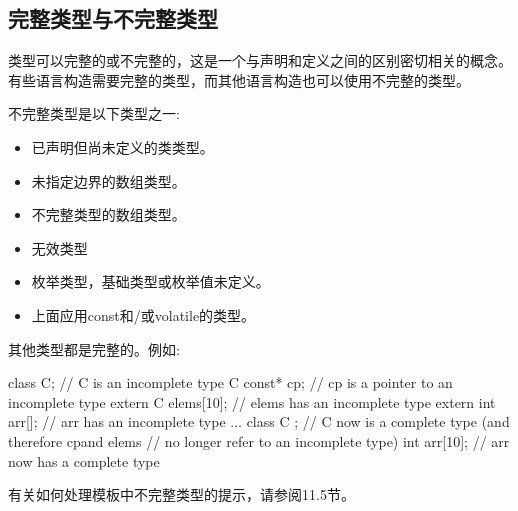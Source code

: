 \subsection{完整类型与不完整类型}

类型可以完整的或不完整的，这是一个与声明和定义之间的区别密切相关的概念。有些语言构造需要完整的类型，而其他语言构造也可以使用不完整的类型。

不完整类型是以下类型之一:

\begin{itemize}
\item 
已声明但尚未定义的类类型。

\item 
未指定边界的数组类型。

\item 
不完整类型的数组类型。

\item 
无效类型

\item 
枚举类型，基础类型或枚举值未定义。

\item 
上面应用const和/或volatile的类型。
\end{itemize}

其他类型都是完整的。例如:

\begin{cpp}
class C; // C is an incomplete type
C const* cp; // cp is a pointer to an incomplete type
extern C elems[10]; // elems has an incomplete type
extern int arr[]; // arr has an incomplete type
...
class C { }; // C now is a complete type (and therefore cpand elems
			 // no longer refer to an incomplete type)
int arr[10]; // arr now has a complete type
\end{cpp}

有关如何处理模板中不完整类型的提示，请参阅11.5节。























